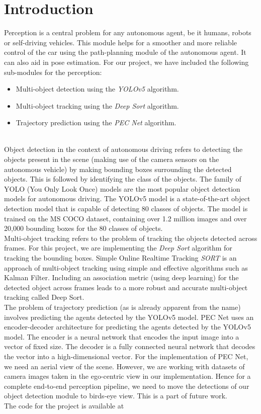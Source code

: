 \documentclass[conference]{IEEEtran}
\begin{document}
\section{Introduction}
Perception is a central problem for any autonomous agent, be it humans, robots or self-driving vehicles. This module helps for a smoother and more reliable control of the car using the path-planning module of the autonomous agent. It can also aid in pose estimation. For our project, we have included the following sub-modules for the perception:
\begin{itemize}
  \item Multi-object detection using the \textit{YOLOv5} algorithm.
  \item Multi-object tracking using the \textit{Deep Sort} algorithm.
  \item Trajectory prediction using the \textit{PEC Net} algorithm.
\end{itemize} \\
Object detection in the context of autonomous driving refers to detecting the objects present in the scene (making use of the camera sensors on the autonomous vehicle) by making bounding boxes surrounding the detected objects. This is followed by identifying the class of the objects. The family of YOLO (You Only Look Once) models are the most popular object detection models for autonomous driving. The YOLOv5 model is a state-of-the-art object detection model that is capable of detecting 80 classes of objects. The model is trained on the MS COCO dataset, containing over 1.2 million images and over 20,000 bounding boxes for the 80 classes of objects. \\
Multi-object tracking refers to the problem of tracking the objects detected across frames. For this project, we are implementing the \textit{Deep Sort} algorithm for tracking the bounding boxes. Simple Online Realtime Tracking \textit{SORT} is an approach of multi-object tracking using simple and effective algorithms such as Kalman Filter. Including an association metric (using deep learning) for the detected object across frames leads to a more robust and accurate multi-object tracking called Deep Sort. \\
The problem of trajectory prediction (as is already apparent from the name) involves predicting the agents detected by the YOLOv5 model. PEC Net uses an encoder-decoder architecture for predicting the agents detected by the YOLOv5 model. The encoder is a neural network that encodes the input image into a vector of fixed size. The decoder is a fully connected neural network that decodes the vector into a high-dimensional vector. For the implementation of PEC Net, we need an aerial view of the scene. However, we are working with datasets of camera images taken in the ego-centric view in our implementation. Hence for a complete end-to-end perception pipeline, we need to move the detections of our object detection module to birds-eye view. This is a part of future work. \\
The code for the project is available at %
\end{document}
